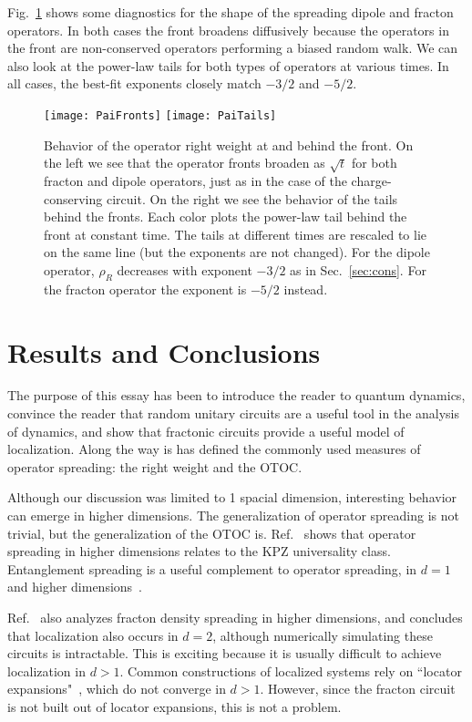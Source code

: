 \documentclass[a4paper,11pt]{article}
\begin{document}
Fig.~\ref{fig:PaiTails} shows some diagnostics for the shape of the spreading dipole and fracton operators. In both cases the front broadens diffusively because the operators in the front are non-conserved operators performing a biased random walk. We can also look at the power-law tails for both types of operators at various times. In all cases, the best-fit exponents closely match $-3/2$ and $-5/2$.
\begin{figure}
	\centering
	\texttt{[image: PaiFronts]}
	\texttt{[image: PaiTails]}
	\caption{Behavior of the operator right weight at and behind the front. 
		On the left we see that the operator fronts broaden as $\sqrt{t}$ for both fracton and dipole operators, just as in the case of the charge-conserving circuit.
		On the right we see the behavior of the tails behind the fronts. Each color plots the power-law tail behind the front at constant time. The tails at different times are rescaled to lie on the same line (but the exponents are not changed). For the dipole operator, $\rho_R$ decreases with exponent $-3/2$ as in Sec.~\ref{sec:cons}. For the fracton operator the exponent is $-5/2$ instead. }
	\label{fig:PaiTails}
\end{figure}


\section{Results and Conclusions} \label{sec:conc}

The purpose of this essay has been to introduce the reader to quantum dynamics, convince the reader that random unitary circuits are a useful tool in the analysis of dynamics, and show that fractonic circuits provide a useful model of localization. Along the way is has defined the commonly used measures of operator spreading: the right weight and the OTOC. 

Although our discussion was limited to 1 spacial dimension, interesting behavior can emerge in higher dimensions. The generalization of operator spreading is not trivial, but the generalization of the OTOC is. Ref.~\cite{NahumOpSp} shows that operator spreading in higher dimensions relates to the KPZ universality class. Entanglement spreading is a useful complement to operator spreading, in $d=1$ and higher dimensions~\cite{NahumEntanglement, NahumRuhmanHuse, JonayEntanglement}.

Ref.~\cite{PaiFracton} also analyzes fracton density spreading in higher dimensions, and concludes that localization also occurs in $d=2$, although numerically simulating these circuits is intractable. This is exciting because it is usually difficult to achieve localization in $d>1$. Common constructions of localized systems rely on ``locator expansions"~\cite{PaiFracton}, which do not converge in $d>1$. However, since the fracton circuit is not built out of locator expansions, this is not a problem.
\end{document}
